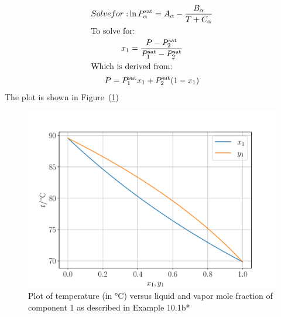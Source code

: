 \documentclass[../main.tex]{subfiles}
\begin{document}
\begin{solution}
\begin{enumerate}[label=(\alph*)]
\begin{gather*}
{          Solve for:
        }
        \ln P_{\alpha}^{\text{sat}} = A_{\alpha} -
        \frac{B_{\alpha}}{T+C_{\alpha}}\\
        \intertext{To solve for:}
        x_{1}=\frac{P-P_{2}^{\text{sat}}}{P_{1}^{\text{sat}}-P_{2}^{\text{sat}}}\\
        \intertext{Which is derived from:}
        P = P_{1}^{\text{sat}}x_{1} + P_{2}^{\text{sat}}(1-x_{1})
      \end{gather*}
      The plot is shown in Figure~(\ref{fig:e10-1b})
      \begin{figure}[h!]
        \centering
        \includegraphics[scale=0.6]{../img/e10-1b.pdf}%
        \caption{Plot of temperature (in \unit{\degreeCelsius})
          versus liquid and vapor mole fraction of component 1 as
          described in Example 10.1b*
        }
        \label{fig:e10-1b}
      \end{figure}
  \end{enumerate}
\end{solution}

%
\end{document}

